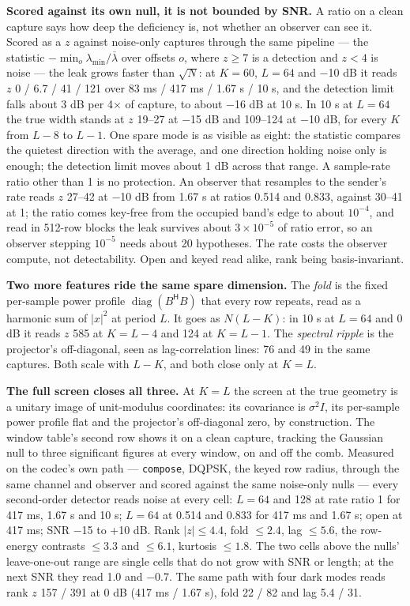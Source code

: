 \documentclass[10pt,letterpaper,twocolumn]{article}
\begin{document}
\textbf{Scored against its own null, it is not bounded by SNR.} A ratio on a clean capture says how deep the deficiency is, not whether an observer can see it. Scored as a \(z\) against noise-only captures through the same pipeline --- the statistic \(-\min_o \lambda_{\min}/\overline{\lambda}\) over offsets \(o\), where \(z \ge 7\) is a detection and \(z < 4\) is noise --- the leak grows faster than \(\sqrt N\): at \(K = 60\), \(L = 64\) and −10 dB it reads \(z\) 0 / 6.7 / 41 / 121 over 83 ms / 417 ms / 1.67 s / 10 s, and the detection limit falls about 3 dB per 4× of capture, to about −16 dB at 10 s. In 10 s at \(L = 64\) the true width stands at \(z\) 19--27 at −15 dB and 109--124 at −10 dB, for every \(K\) from \(L - 8\) to \(L - 1\). One spare mode is as visible as eight: the statistic compares the quietest direction with the average, and one direction holding noise only is enough; the detection limit moves about 1 dB across that range. A sample-rate ratio other than 1 is no protection. An observer that resamples to the sender's rate reads \(z\) 27--42 at −10 dB from 1.67 s at ratios 0.514 and 0.833, against 30--41 at 1; the ratio comes key-free from the occupied band's edge to about \(10^{-4}\), and read in 512-row blocks the leak survives about \(3\times10^{-5}\) of ratio error, so an observer stepping \(10^{-5}\) needs about 20 hypotheses. The rate costs the observer compute, not detectability. Open and keyed read alike, rank being basis-invariant.

\textbf{Two more features ride the same spare dimension.} The \emph{fold} is the fixed per-sample power profile \(\operatorname{diag}(B^{\mathsf H}B)\) that every row repeats, read as a harmonic sum of \(|x|^2\) at period \(L\). It goes as \(N(L-K)\): in 10 s at \(L = 64\) and 0 dB it reads \(z\) 585 at \(K = L - 4\) and 124 at \(K = L - 1\). The \emph{spectral ripple} is the projector's off-diagonal, seen as lag-correlation lines: 76 and 49 in the same captures. Both scale with \(L - K\), and both close only at \(K = L\).

\textbf{The full screen closes all three.} At \(K = L\) the screen at the true geometry is a unitary image of unit-modulus coordinates: its covariance is \(\sigma^2 I\), its per-sample power profile flat and the projector's off-diagonal zero, by construction. The window table's second row shows it on a clean capture, tracking the Gaussian null to three significant figures at every window, on and off the comb. Measured on the codec's own path --- \texttt{compose}, DQPSK, the keyed row radius, through the same channel and observer and scored against the same noise-only nulls --- every second-order detector reads noise at every cell: \(L = 64\) and 128 at rate ratio 1 for 417 ms, 1.67 s and 10 s; \(L = 64\) at 0.514 and 0.833 for 417 ms and 1.67 s; open at 417 ms; SNR −15 to +10 dB. Rank \(|z| \le 4.4\), fold \(\le 2.4\), lag \(\le 5.6\), the row-energy contrasts \(\le 3.3\) and \(\le 6.1\), kurtosis \(\le 1.8\). The two cells above the nulls' leave-one-out range are single cells that do not grow with SNR or length; at the next SNR they read 1.0 and −0.7. The same path with four dark modes reads rank \(z\) 157 / 391 at 0 dB (417 ms / 1.67 s), fold 22 / 82 and lag 5.4 / 31.
\end{document}
